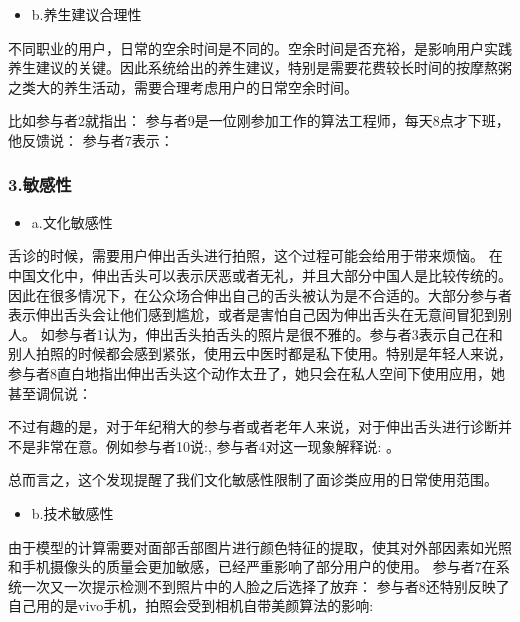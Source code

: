 \begin{itemize}
\item b.养生建议合理性
\end{itemize}

不同职业的用户，日常的空余时间是不同的。空余时间是否充裕，是影响用户实践养生建议的关键。因此系统给出的养生建议，特别是需要花费较长时间的按摩熬粥之类大的养生活动，需要合理考虑用户的日常空余时间。

比如参与者2就指出：
参与者9是一位刚参加工作的算法工程师，每天8点才下班，他反馈说： 参与者7表示：

\subsubsection{3.敏感性}

\begin{itemize}
\item a.文化敏感性
\end{itemize}


舌诊的时候，需要用户伸出舌头进行拍照，这个过程可能会给用于带来烦恼。
在中国文化中，伸出舌头可以表示厌恶或者无礼，并且大部分中国人是比较传统的。因此在很多情况下，在公众场合伸出自己的舌头被认为是不合适的。大部分参与者表示伸出舌头会让他们感到尴尬，或者是害怕自己因为伸出舌头在无意间冒犯到别人。
如参与者1认为，伸出舌头拍舌头的照片是很不雅的。参与者3表示自己在和别人拍照的时候都会感到紧张，使用云中医时都是私下使用。特别是年轻人来说，参与者8直白地指出伸出舌头这个动作太丑了，她只会在私人空间下使用应用，她甚至调侃说：

不过有趣的是，对于年纪稍大的参与者或者老年人来说，对于伸出舌头进行诊断并不是非常在意。例如参与者10说:, 参与者4对这一现象解释说: 。 

总而言之，这个发现提醒了我们文化敏感性限制了面诊类应用的日常使用范围。


\begin{itemize}
\item b.技术敏感性
\end{itemize}


由于模型的计算需要对面部舌部图片进行颜色特征的提取，使其对外部因素如光照和手机摄像头的质量会更加敏感，已经严重影响了部分用户的使用。
参与者7在系统一次又一次提示检测不到照片中的人脸之后选择了放弃：
参与者8还特别反映了自己用的是vivo手机，拍照会受到相机自带美颜算法的影响: 

